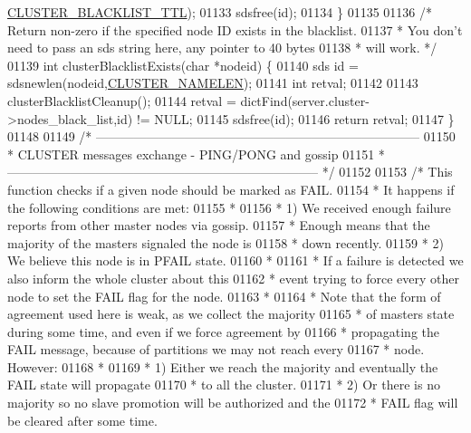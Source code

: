 \begin{DoxyCode}
{{{{{{{{{{{{{{{      \hyperlink{cluster_8c_a8fb5fdcd1cd5787957afc9ea62519937}{CLUSTER\_BLACKLIST\_TTL});
01133     sdsfree(id);
01134 \}
01135 
01136 \textcolor{comment}{/* Return non-zero if the specified node ID exists in the blacklist.}
01137 \textcolor{comment}{ * You don't need to pass an sds string here, any pointer to 40 bytes}
01138 \textcolor{comment}{ * will work. */}
01139 \textcolor{keywordtype}{int} clusterBlacklistExists(\textcolor{keywordtype}{char} *nodeid) \{
01140     sds id = sdsnewlen(nodeid,\hyperlink{cluster_8h_ace7a882972eff7149675252938643b6e}{CLUSTER\_NAMELEN});
01141     \textcolor{keywordtype}{int} retval;
01142 
01143     clusterBlacklistCleanup();
01144     retval = dictFind(server.cluster->nodes\_black\_list,id) != NULL;
01145     sdsfree(id);
01146     \textcolor{keywordflow}{return} retval;
01147 \}
01148 
01149 \textcolor{comment}{/* -----------------------------------------------------------------------------}
01150 \textcolor{comment}{ * CLUSTER messages exchange - PING/PONG and gossip}
01151 \textcolor{comment}{ * -------------------------------------------------------------------------- */}
01152 
01153 \textcolor{comment}{/* This function checks if a given node should be marked as FAIL.}
01154 \textcolor{comment}{ * It happens if the following conditions are met:}
01155 \textcolor{comment}{ *}
01156 \textcolor{comment}{ * 1) We received enough failure reports from other master nodes via gossip.}
01157 \textcolor{comment}{ *    Enough means that the majority of the masters signaled the node is}
01158 \textcolor{comment}{ *    down recently.}
01159 \textcolor{comment}{ * 2) We believe this node is in PFAIL state.}
01160 \textcolor{comment}{ *}
01161 \textcolor{comment}{ * If a failure is detected we also inform the whole cluster about this}
01162 \textcolor{comment}{ * event trying to force every other node to set the FAIL flag for the node.}
01163 \textcolor{comment}{ *}
01164 \textcolor{comment}{ * Note that the form of agreement used here is weak, as we collect the majority}
01165 \textcolor{comment}{ * of masters state during some time, and even if we force agreement by}
01166 \textcolor{comment}{ * propagating the FAIL message, because of partitions we may not reach every}
01167 \textcolor{comment}{ * node. However:}
01168 \textcolor{comment}{ *}
01169 \textcolor{comment}{ * 1) Either we reach the majority and eventually the FAIL state will propagate}
01170 \textcolor{comment}{ *    to all the cluster.}
01171 \textcolor{comment}{ * 2) Or there is no majority so no slave promotion will be authorized and the}
01172 \textcolor{comment}{ *    FAIL flag will be cleared after some time.}
}}}}}}}}}}}}}}}
\end{DoxyCode}
